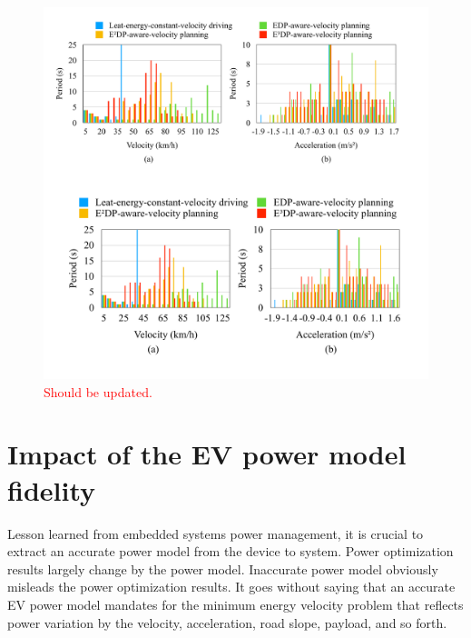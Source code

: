 \documentclass{IEEEtran}
\begin{document}
\begin{figure}	%
\centering
\includegraphics[width=\hsize]{Figures/Histogram.pdf}
\caption{\textcolor{red}{Should be updated.}}
\label{fig:histogram}
\end{figure} 


\section{Impact of the EV power model fidelity} \label{sec:impact_EV_power model}

Lesson learned from embedded systems power management, it is crucial to extract an accurate power model from the device to system. Power optimization results largely change by the power model. Inaccurate power model obviously misleads the power optimization results. It goes without saying that an accurate EV power model mandates for the minimum energy velocity problem that reflects power variation by the velocity, acceleration, road slope, payload, and so forth.
\end{document}
